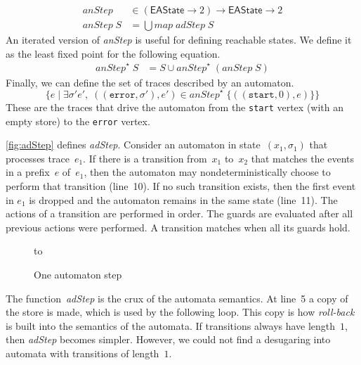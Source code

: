 \documentclass[preprint]{sigplanconf} %
\newcommand{\set}[1]{\ensuremath{\mathsf{#1}}}
\theoremstyle{definition}
\begin{document}
\begin{align}
\mathit{anStep}&\in(\set{EAState}\to2)\to\set{EAState}\to2 \\
\mathit{anStep}\;S&=\bigcup \mathit{map}\;\mathit{adStep}\;S
\end{align}
An iterated version of \textit{anStep} is useful for defining reachable states.
We define it as the least fixed point for the following equation.
\begin{align}
\mathit{anStep}^\star\;S &= S \cup \mathit{anStep}^\star\;(\mathit{anStep}\;S)
\end{align}
Finally, we can define the set of traces described by an automaton.
\[ \{ e \mid \exists\sigma'e',\;((\mathtt{error},\sigma'),e')\in\mathit{anStep}^\star\;\{((\mathtt{start},0),e)\}\} \]
These are the traces that drive the automaton from the \texttt{start} vertex (with an empty store) to the \texttt{error} vertex.

\autoref{fig:adStep} defines \textit{adStep}.
Consider an automaton in state~$(x_1,\sigma_1)$ that processes trace~$e_1$.
If there is a transition from~$x_1$ to~$x_2$ that matches the events in a prefix~$e$ of~$e_1$, then the automaton may nondeterministically choose to perform that transition (line~10).
If no such transition exists, then the first event in $e_1$ is dropped and the automaton remains in the same state (line~11).
The actions of a transition are performed in order.
The guards are evaluated after all previous actions were performed.
A transition matches when all its guards hold.

\begin{figure}
\hbox to
\caption{One automaton step}
\label{fig:adStep}
\end{figure}

The function~\textit{adStep} is the crux of the automata semantics.
At line~5 a copy of the store is made, which is used by the following loop.
This copy is how \emph{roll-back} is built into the semantics of the automata.
If transitions always have length~$1$, then \textit{adStep} becomes simpler.
However, we could not find a desugaring into automata with transitions of length~$1$.
\end{document}
